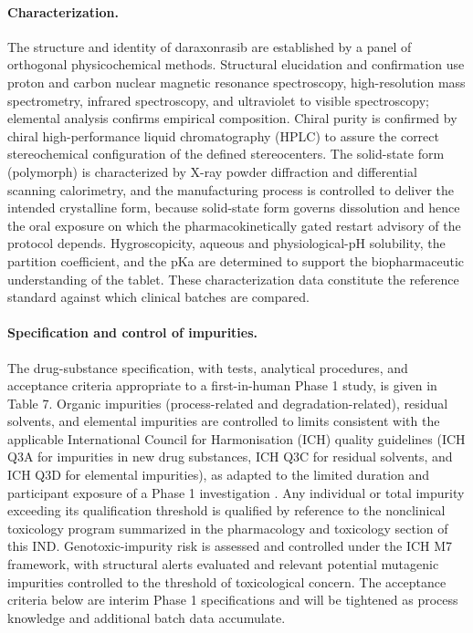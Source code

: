 \paragraph{Characterization.}
The structure and identity of daraxonrasib are established by a panel of
orthogonal physicochemical methods. Structural elucidation and confirmation use
proton and carbon nuclear magnetic resonance spectroscopy, high-resolution mass
spectrometry, infrared spectroscopy, and ultraviolet to visible spectroscopy;
elemental analysis confirms empirical composition. Chiral purity is confirmed by
chiral high-performance liquid chromatography (HPLC) to assure the correct
stereochemical configuration of the defined stereocenters. The solid-state form
(polymorph) is characterized by X-ray powder diffraction and differential
scanning calorimetry, and the manufacturing process is controlled to deliver the
intended crystalline form, because solid-state form governs dissolution and
hence the oral exposure on which the pharmacokinetically gated restart advisory
of the protocol depends. Hygroscopicity, aqueous and physiological-pH
solubility, the partition coefficient, and the pKa are determined to support the
biopharmaceutic understanding of the tablet. These characterization data
constitute the reference standard against which clinical batches are compared.

\paragraph{Specification and control of impurities.}
The drug-substance specification, with tests, analytical procedures, and
acceptance criteria appropriate to a first-in-human Phase 1 study, is given in
Table 7. Organic impurities (process-related and degradation-related), residual
solvents, and elemental impurities are controlled to limits consistent with the
applicable International Council for Harmonisation (ICH) quality guidelines (ICH
Q3A for impurities in new drug substances, ICH Q3C for residual solvents, and
ICH Q3D for elemental impurities), as adapted to the limited duration and
participant exposure of a Phase 1 investigation
\cite{ichpaistduni,phase1guidance}. Any individual or total impurity exceeding
its qualification threshold is qualified by reference to the nonclinical
toxicology program summarized in the pharmacology and toxicology section of this
IND. Genotoxic-impurity risk is assessed and controlled under the ICH M7
framework, with structural alerts evaluated and relevant potential mutagenic
impurities controlled to the threshold of toxicological concern. The acceptance
criteria below are interim Phase 1 specifications and will be tightened as
process knowledge and additional batch data accumulate.


